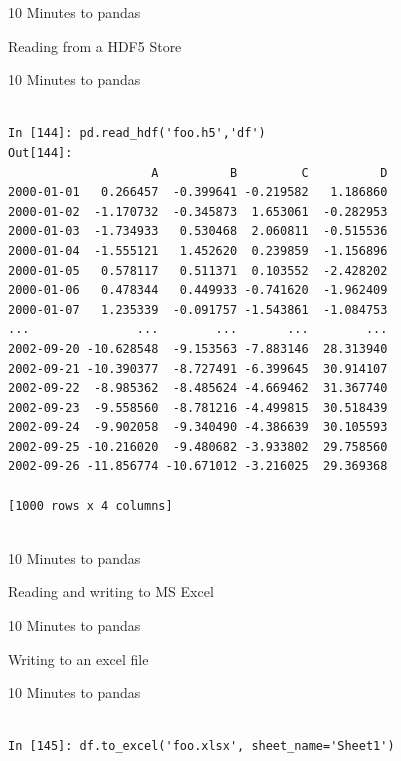 \documentclass{beamer}
\begin{document}
\begin{frame}[t]{10 Minutes to pandas}

Reading from a HDF5 Store

\end{frame}


\begin{frame}[t,fragile]{10 Minutes to pandas}


	\scriptsize
\begin{verbatim}

In [144]: pd.read_hdf('foo.h5','df')
Out[144]: 
                    A          B         C          D
2000-01-01   0.266457  -0.399641 -0.219582   1.186860
2000-01-02  -1.170732  -0.345873  1.653061  -0.282953
2000-01-03  -1.734933   0.530468  2.060811  -0.515536
2000-01-04  -1.555121   1.452620  0.239859  -1.156896
2000-01-05   0.578117   0.511371  0.103552  -2.428202
2000-01-06   0.478344   0.449933 -0.741620  -1.962409
2000-01-07   1.235339  -0.091757 -1.543861  -1.084753
...               ...        ...       ...        ...
2002-09-20 -10.628548  -9.153563 -7.883146  28.313940
2002-09-21 -10.390377  -8.727491 -6.399645  30.914107
2002-09-22  -8.985362  -8.485624 -4.669462  31.367740
2002-09-23  -9.558560  -8.781216 -4.499815  30.518439
2002-09-24  -9.902058  -9.340490 -4.386639  30.105593
2002-09-25 -10.216020  -9.480682 -3.933802  29.758560
2002-09-26 -11.856774 -10.671012 -3.216025  29.369368

[1000 rows x 4 columns]


\end{verbatim}


\end{frame}


\begin{frame}[t]{10 Minutes to pandas}

Reading and writing to MS Excel

\end{frame}


\begin{frame}[t]{10 Minutes to pandas}

Writing to an excel file

\end{frame}


\begin{frame}[t,fragile]{10 Minutes to pandas}


	\scriptsize
\begin{verbatim}

In [145]: df.to_excel('foo.xlsx', sheet_name='Sheet1')


\end{verbatim}


\end{frame}
\end{document}

